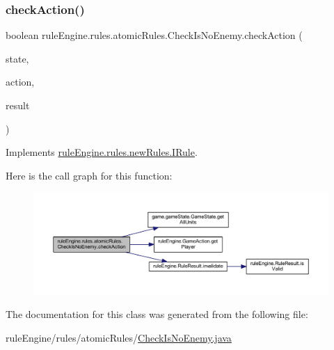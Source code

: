 \subsubsection{\texorpdfstring{check\+Action()}{checkAction()}}
{\footnotesize\ttfamily boolean rule\+Engine.\+rules.\+atomic\+Rules.\+Check\+Is\+No\+Enemy.\+check\+Action (\begin{DoxyParamCaption}\item[{\mbox{\hyperlink{classgame_1_1game_state_1_1_game_state}{Game\+State}}}]{state,  }\item[{\mbox{\hyperlink{classrule_engine_1_1_game_action}{Game\+Action}}}]{action,  }\item[{\mbox{\hyperlink{classrule_engine_1_1_rule_result}{Rule\+Result}}}]{result }\end{DoxyParamCaption})\hspace{0.3cm}{\ttfamily [inline]}}



Implements \mbox{\hyperlink{interfacerule_engine_1_1rules_1_1new_rules_1_1_i_rule_a72ce29a47d7a5fba75a09444a50a481e}{rule\+Engine.\+rules.\+new\+Rules.\+I\+Rule}}.

Here is the call graph for this function\+:
\nopagebreak
\begin{figure}[H]
\begin{center}
\leavevmode
\includegraphics[width=350pt]{classrule_engine_1_1rules_1_1atomic_rules_1_1_check_is_no_enemy_a2a3e22e04dd8057b3a0c115957003964_cgraph}
\end{center}
\end{figure}


The documentation for this class was generated from the following file\+:\begin{DoxyCompactItemize}
\item 
rule\+Engine/rules/atomic\+Rules/\mbox{\hyperlink{_check_is_no_enemy_8java}{Check\+Is\+No\+Enemy.\+java}}\end{DoxyCompactItemize}
